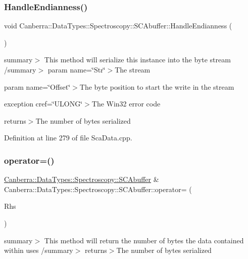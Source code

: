 \subsubsection{\texorpdfstring{Handle\+Endianness()}{HandleEndianness()}}
{\footnotesize\ttfamily void Canberra\+::\+Data\+Types\+::\+Spectroscopy\+::\+S\+C\+Abuffer\+::\+Handle\+Endianness (\begin{DoxyParamCaption}{ }\end{DoxyParamCaption})\hspace{0.3cm}{\ttfamily [protected]}}

summary$>$ This method will serialize this instance into the byte stream /summary$>$ param name=\char`\"{}\+Str\char`\"{}$>$The stream

param name=\char`\"{}\+Offset\char`\"{}$>$The byte position to start the write in the stream

exception cref=\char`\"{}\+U\+L\+O\+N\+G\char`\"{}$>$The Win32 error code

returns$>$The number of bytes serialized

Definition at line 279 of file Sca\+Data.\+cpp.

\mbox{\label{class_canberra_1_1_data_types_1_1_spectroscopy_1_1_s_c_abuffer_aeefc09dfec140406091d7ba28b2d40a2_aeefc09dfec140406091d7ba28b2d40a2}} 
\subsubsection{\texorpdfstring{operator=()}{operator=()}}
{\footnotesize\ttfamily \hyperlink{class_canberra_1_1_data_types_1_1_spectroscopy_1_1_s_c_abuffer}{Canberra\+::\+Data\+Types\+::\+Spectroscopy\+::\+S\+C\+Abuffer} \& Canberra\+::\+Data\+Types\+::\+Spectroscopy\+::\+S\+C\+Abuffer\+::operator= (\begin{DoxyParamCaption}\item[{const \hyperlink{class_canberra_1_1_data_types_1_1_spectroscopy_1_1_s_c_abuffer}{S\+C\+Abuffer} \&}]{Rhs }\end{DoxyParamCaption})}

summary$>$ This method will return the number of bytes the data contained within uses /summary$>$ returns$>$The number of bytes serialized

